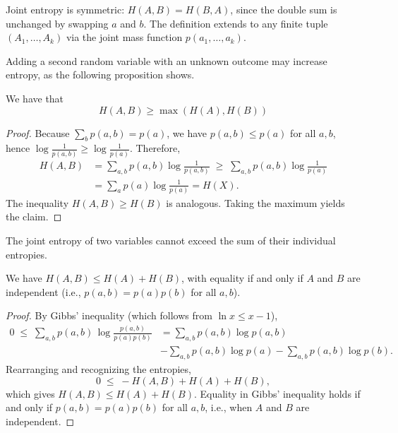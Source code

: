 Joint entropy is symmetric: $H(A, B)=H(B, A)$, since the double sum is unchanged by swapping $a$ and $b$. The definition extends to any finite tuple $(A_1, \ldots, A_k)$ via the joint mass function $p(a_1, \ldots, a_k)$.

Adding a second random variable with an unknown outcome may increase entropy, as the following proposition shows.

\begin{proposition}
We have that
\[
H(A, B) \geq \max \left( H(A), H(B) \right)
\]
\end{proposition}
\begin{proof}
Because $\sum_{b}p(a,b)=p(a)$, we have $p(a,b)\le p(a)$ for all $a,b$, hence $\log\frac{1}{p(a,b)}\ge \log\frac{1}{p(a)}$. Therefore,
\begin{equation*}
\begin{split}
H(A, B) & = \sum_{a,b} p(a,b)\log\frac{1}{p(a,b)}
\;\ge\; \sum_{a,b} p(a,b)\log\frac{1}{p(a)} \\
& = \sum_{a} p(a)\log\frac{1}{p(a)}=H(X).
\end{split}
\end{equation*}
The inequality $H(A, B)\ge H(B)$ is analogous. Taking the maximum yields the claim.
\end{proof}

The joint entropy of two variables cannot exceed the sum of their individual entropies.

\begin{proposition}
\label{prop:joint_entropy}
We have $H(A, B)\le H(A) + H(B)$, with equality if and only if $A$ and $B$ are independent (i.e., $p(a,b)=p(a)p(b)$ for all $a,b$).
\end{proposition}
\begin{proof}
By Gibbs' inequality (which follows from $\ln x\le x-1$),
\begin{equation*}
\begin{split}
0 \;\le\; \sum_{a,b} p(a,b)\,\log\frac{p(a,b)}{p(a)p(b)}
& = \sum_{a,b} p(a,b)\log p(a,b) \\
& - \sum_{a,b} p(a,b)\log p(a) - \sum_{a,b} p(a,b)\log p(b).
\end{split}
\end{equation*}
Rearranging and recognizing the entropies,
\[
0 \;\le\; -H(A, B) + H(A) + H(B),
\]
which gives $H(A, B) \le H(A) + H(B)$. Equality in Gibbs' inequality holds if and only if $p(a,b)=p(a)p(b)$ for all $a,b$, i.e., when $A$ and $B$ are independent.
\end{proof}

